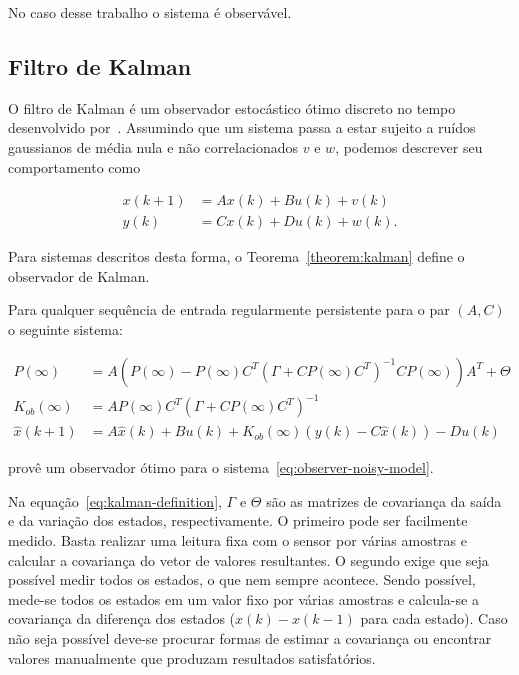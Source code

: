 No caso desse trabalho o sistema é observável.

\subsection{Filtro de Kalman}%
\label{subsec:kalman}

O filtro de Kalman é um observador estocástico ótimo discreto no tempo
desenvolvido por~\textcite{Kalman1960}. Assumindo que um sistema passa a estar
sujeito a ruídos gaussianos de média nula e não correlacionados \( v \) e \( w
\), podemos descrever seu comportamento como

\begin{equation}
	\label{eq:observer-noisy-model}
	\begin{aligned}
		x(k+1) & = Ax(k) + Bu(k) + v(k) \\
		y(k)   & = Cx(k) +Du(k) + w(k).
	\end{aligned}
\end{equation}

Para sistemas descritos desta forma, o Teorema~\ref{theorem:kalman} define o
observador de Kalman.

\begin{theorem}%
	\label{theorem:kalman}
	Para qualquer sequência de entrada regularmente persistente para o par \(
	(A, C) \) o seguinte sistema:

	\begin{equation}
		\label{eq:kalman-definition}
		\begin{aligned}
			P(\infty)      & =A(P(\infty)-P(\infty)C^T{(\Gamma+CP(\infty)C^T)}^{-1}CP(\infty))A^T+\Theta \\
			K_{ob}(\infty) & =AP(\infty)C^T{(\Gamma+CP(\infty)C^T)}^{-1}                                 \\
			\hat{x}(k+1)   & = A\hat{x}(k) + Bu(k) + K_{ob}(\infty)(y(k) - C\hat{x}(k))-Du(k)
		\end{aligned}
	\end{equation}

	provê um observador  ótimo para o sistema~\eqref{eq:observer-noisy-model}.
\end{theorem}

Na equação~\eqref{eq:kalman-definition}, \( \Gamma \) e \( \Theta \) são as
matrizes de covariança da saída e da variação dos estados, respectivamente. O
primeiro pode ser facilmente medido. Basta realizar uma leitura fixa com o
sensor por várias amostras e calcular a covariança do vetor de valores
resultantes. O segundo exige que seja possível medir todos os estados, o que nem
sempre acontece. Sendo possível, mede-se todos os estados em um valor fixo por
várias amostras e calcula-se a covariança da diferença dos estados (\( x(k) -
x(k-1) \) para cada estado). Caso não seja possível deve-se procurar formas de
estimar a covariança ou encontrar valores manualmente que produzam resultados
satisfatórios.

